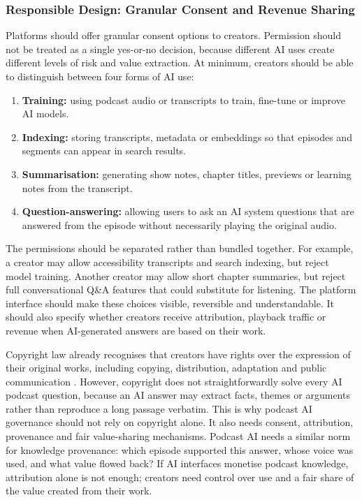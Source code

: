 \documentclass[11pt,a4paper]{article}
\begin{document}
\subsubsection{Responsible Design: Granular Consent and Revenue Sharing}


Platforms should offer granular consent options to creators. Permission should not be treated as a single yes-or-no decision, because different AI uses create different levels of risk and value extraction. At minimum, creators should be able to distinguish between four forms of AI use:

\begin{enumerate}
    \item \textbf{Training:} using podcast audio or transcripts to train, fine-tune or improve AI models.
    \item \textbf{Indexing:} storing transcripts, metadata or embeddings so that episodes and segments can appear in search results.
    \item \textbf{Summarisation:} generating show notes, chapter titles, previews or learning notes from the transcript.
    \item \textbf{Question-answering:} allowing users to ask an AI system questions that are answered from the episode without necessarily playing the original audio.
\end{enumerate}

The permissions should be separated rather than bundled together. For example, a creator may allow accessibility transcripts and search indexing, but reject model training. Another creator may allow short chapter summaries, but reject full conversational Q\&A features that could substitute for listening. The platform interface should make these choices visible, reversible and understandable. It should also specify whether creators receive attribution, playback traffic or revenue when AI-generated answers are based on their work.


Copyright law already recognises that creators have rights over the expression of their original works, including copying, distribution, adaptation and public communication \cite{WIPO2026Copyright,GovUK2026Copyright}. However, copyright does not straightforwardly solve every AI podcast question, because an AI answer may extract facts, themes or arguments rather than reproduce a long passage verbatim. This is why podcast AI governance should not rely on copyright alone. It also needs consent, attribution, provenance and fair value-sharing mechanisms. Podcast AI needs a similar norm for knowledge provenance: which episode supported this answer, whose voice was used, and what value flowed back? If AI interfaces monetise podcast knowledge, attribution alone is not enough; creators need control over use and a fair share of the value created from their work.
\end{document}
